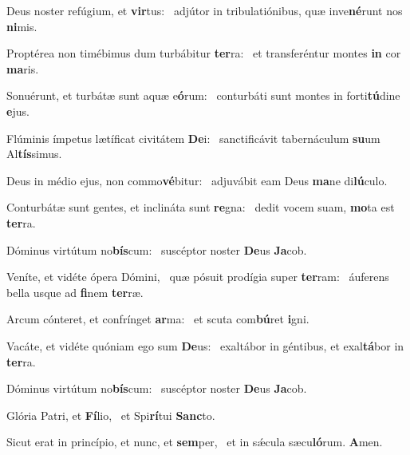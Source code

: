 \item Deus noster refúgium, et \textbf{vir}tus:~\psstar{} adjútor in tribulatiónibus, quæ inve\textbf{né}runt nos \textbf{ni}mis.
\item Proptérea non timébimus dum turbábitur \textbf{ter}ra:~\psstar{} et transferéntur montes \textbf{in} cor \textbf{ma}ris.
\item Sonuérunt, et turbátæ sunt aquæ e\textbf{ó}rum:~\psstar{} conturbáti sunt montes in forti\textbf{tú}dine \textbf{e}jus.
\item Flúminis ímpetus lætíficat civitátem \textbf{De}i:~\psstar{} sanctificávit tabernáculum \textbf{su}um Al\textbf{tís}simus.
\item Deus in médio ejus, non commo\textbf{vé}bitur:~\psstar{} adjuvábit eam Deus \textbf{ma}ne di\textbf{lú}culo.
\item Conturbátæ sunt gentes, et inclináta sunt \textbf{re}gna:~\psstar{} dedit vocem suam, \textbf{mo}ta est \textbf{ter}ra.
\item Dóminus virtútum no\textbf{bís}\-cum:~\psstar{} suscéptor noster \textbf{De}us \textbf{Ja}cob.
\item Veníte, et vidéte ópera Dómini,~\pscross{} quæ pósuit prodígia super \textbf{ter}ram:~\psstar{} áuferens bella usque ad \textbf{fi}nem \textbf{ter}ræ.
\item Arcum cónteret, et confrínget \textbf{ar}ma:~\psstar{} et scuta com\textbf{bú}ret \textbf{i}gni.
\item Vacáte, et vidéte quóniam ego sum \textbf{De}us:~\psstar{} exaltábor in géntibus, et exal\textbf{tá}bor in \textbf{ter}ra.
\item Dóminus virtútum no\textbf{bís}\-cum:~\psstar{} suscéptor noster \textbf{De}us \textbf{Ja}cob.
\item Glória Patri, et \textbf{Fí}lio,~\psstar{} et Spi\textbf{rí}tui \textbf{Sanc}to.
\item Sicut erat in princípio, et nunc, et \textbf{sem}per,~\psstar{} et in sǽcula sæcu\textbf{ló}rum. \textbf{A}men.
